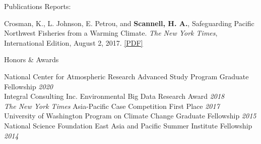 \documentclass{resume} %
\begin{document}
\begin{rSection}{Publications}
Reports:
\begin{etaremune}
\item

{Crosman, K., L. Johnson, E. Petrou, and {\bf Scannell, H. A.}, Safeguarding Pacific Northwest Fisheries from a Warming Climate. \textit{The New York Times}, International Edition, August 2, 2017. \href{https://apru.org/wp-content/uploads/2018/12/NYT-APRU-Case-winners-booklet-571b.pdf}{[PDF]}}
\end{etaremune}

\end{rSection}



\begin{rSection}{Honors \& Awards}

National Center for Atmospheric Research Advanced Study Program Graduate Fellowship \hfill {\em 2020} \\
Integral Consulting Inc. Environmental Big Data Research Award
\hfill {\em 2018} \\
\textit{The New York Times} Asia-Pacific Case Competition First Place
\hfill {\em 2017} \\
University of Washington Program on Climate Change Graduate Fellowship
\hfill {\em 2015} \\
National Science Foundation East Asia and Pacific Summer Institute Fellowship
\hfill {\em 2014}
\end{rSection}


\end{document}
